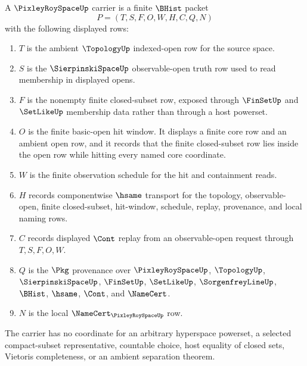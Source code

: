 \begin{definition}
\label{def:pixley-roy-space-carrier}
A $\PixleyRoySpaceUp$ carrier is a finite $\BHist$ packet
$$
P=(T,S,F,O,W,H,C,Q,N)
$$
with the following displayed rows:
\begin{enumerate}
\item $T$ is the ambient $\TopologyUp$ indexed-open row for the source space.
\item $S$ is the $\SierpinskiSpaceUp$ observable-open truth row used to read membership in displayed opens.
\item $F$ is the nonempty finite closed-subset row, exposed through $\FinSetUp$ and $\SetLikeUp$ membership data rather than through a host powerset.
\item $O$ is the finite basic-open hit window. It displays a finite core row and an ambient open row, and it records that the finite closed-subset row lies inside the open row while hitting every named core coordinate.
\item $W$ is the finite observation schedule for the hit and containment reads.
\item $H$ records componentwise $\hsame$ transport for the topology, observable-open, finite closed-subset, hit-window, schedule, replay, provenance, and local naming rows.
\item $C$ records displayed $\Cont$ replay from an observable-open request through $T,S,F,O,W$.
\item $Q$ is the $\Pkg$ provenance over $\PixleyRoySpaceUp$, $\TopologyUp$, $\SierpinskiSpaceUp$, $\FinSetUp$, $\SetLikeUp$, $\SorgenfreyLineUp$, $\BHist$, $\hsame$, $\Cont$, and $\NameCert$.
\item $N$ is the local $\NameCert_{\PixleyRoySpaceUp}$ row.
\end{enumerate}
The carrier has no coordinate for an arbitrary hyperspace powerset, a selected compact-subset representative, countable choice, host equality of closed sets, Vietoris completeness, or an ambient separation theorem.
\end{definition}

